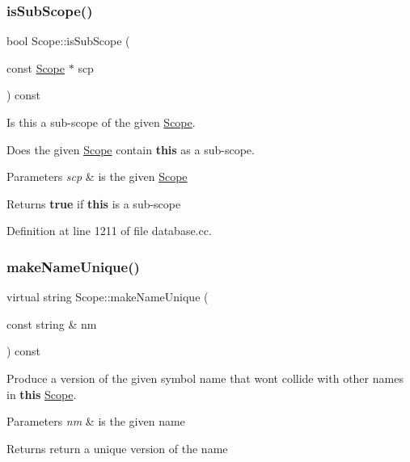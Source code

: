 \subsubsection{\texorpdfstring{isSubScope()}{isSubScope()}}
{\footnotesize\ttfamily bool Scope\+::is\+Sub\+Scope (\begin{DoxyParamCaption}\item[{const \mbox{\hyperlink{class_scope}{Scope}} $\ast$}]{scp }\end{DoxyParamCaption}) const}



Is this a sub-\/scope of the given \mbox{\hyperlink{class_scope}{Scope}}. 

Does the given \mbox{\hyperlink{class_scope}{Scope}} contain {\bfseries{this}} as a sub-\/scope. 
\begin{DoxyParams}{Parameters}
{\em scp} & is the given \mbox{\hyperlink{class_scope}{Scope}} \\
\hline
\end{DoxyParams}
\begin{DoxyReturn}{Returns}
{\bfseries{true}} if {\bfseries{this}} is a sub-\/scope 
\end{DoxyReturn}


Definition at line 1211 of file database.\+cc.

\mbox{\label{class_scope_a2e0d945c44f4874743496b2814fbb631}} 
\subsubsection{\texorpdfstring{makeNameUnique()}{makeNameUnique()}}
{\footnotesize\ttfamily virtual string Scope\+::make\+Name\+Unique (\begin{DoxyParamCaption}\item[{const string \&}]{nm }\end{DoxyParamCaption}) const\hspace{0.3cm}{\ttfamily [pure virtual]}}



Produce a version of the given symbol name that won\textquotesingle{}t collide with other names in {\bfseries{this}} \mbox{\hyperlink{class_scope}{Scope}}. 


\begin{DoxyParams}{Parameters}
{\em nm} & is the given name \\
\hline
\end{DoxyParams}
\begin{DoxyReturn}{Returns}
return a unique version of the name 
\end{DoxyReturn}


